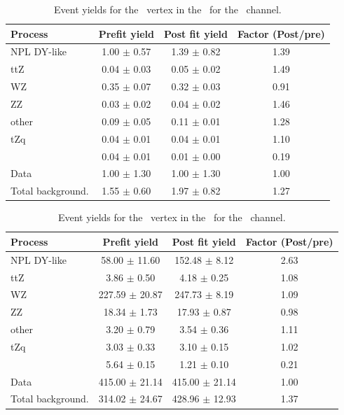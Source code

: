 \newpage
\begin{table}[htbp]
	\centering
	\caption{Event yields for the \Zut\ vertex in the \STCR\  for the \eee\ channel. }
	\begin{tabular} {l c c c }
		\toprule
		Process & Prefit yield & Post fit yield & Factor (Post/pre) \\
		\midrule
		NPL DY-like & 1.00 $ \pm $ 0.57 & 1.39 $ \pm $ 0.82 & 1.39 \\ 
		ttZ & 0.04 $ \pm $ 0.03 & 0.05 $ \pm $ 0.02 & 1.49 \\ 
		WZ & 0.35 $ \pm $ 0.07 & 0.32 $ \pm $ 0.03 & 0.91 \\ 
		ZZ & 0.03 $ \pm $ 0.02 & 0.04 $ \pm $ 0.02 & 1.46 \\ 
		other & 0.09 $ \pm $ 0.05 & 0.11 $ \pm $ 0.01 & 1.28 \\ 
		tZq & 0.04 $ \pm $ 0.01 & 0.04 $ \pm $ 0.01 & 1.10 \\ 
		\kZut  & 0.04 $ \pm $ 0.01 & 0.01 $ \pm $ 0.00 & 0.19\\
		\hdashline
		Data & 1.00 $ \pm $ 1.30 & 1.00 $ \pm $ 1.30 & 1.00\\
		Total background. & 1.55 $ \pm $ 0.60 & 1.97 $ \pm $ 0.82 & 1.27\\
		\bottomrule
	\end{tabular}
\end{table}
\begin{table}[htbp]
	\centering
	\caption{Event yields for the \Zut\ vertex in the \WZCR\  for the \mumumu\ channel. }
	\begin{tabular} {l c c c }
		\toprule
		Process & Prefit yield & Post fit yield & Factor (Post/pre) \\
		\midrule
		NPL DY-like & 58.00 $ \pm $ 11.60 & 152.48 $ \pm $ 8.12 & 2.63 \\ 
		ttZ & 3.86 $ \pm $ 0.50 & 4.18 $ \pm $ 0.25 & 1.08 \\ 
		WZ & 227.59 $ \pm $ 20.87 & 247.73 $ \pm $ 8.19 & 1.09 \\ 
		ZZ & 18.34 $ \pm $ 1.73 & 17.93 $ \pm $ 0.87 & 0.98 \\ 
		other & 3.20 $ \pm $ 0.79 & 3.54 $ \pm $ 0.36 & 1.11 \\ 
		tZq & 3.03 $ \pm $ 0.33 & 3.10 $ \pm $ 0.15 & 1.02 \\ 
		\kZut  & 5.64 $ \pm $ 0.15 & 1.21 $ \pm $ 0.10 & 0.21\\
		\hdashline
		Data & 415.00 $ \pm $ 21.14 & 415.00 $ \pm $ 21.14 & 1.00\\
		Total background. & 314.02 $ \pm $ 24.67 & 428.96 $ \pm $ 12.93 & 1.37\\
		\bottomrule
	\end{tabular}
\end{table}
\cleardoublepage
